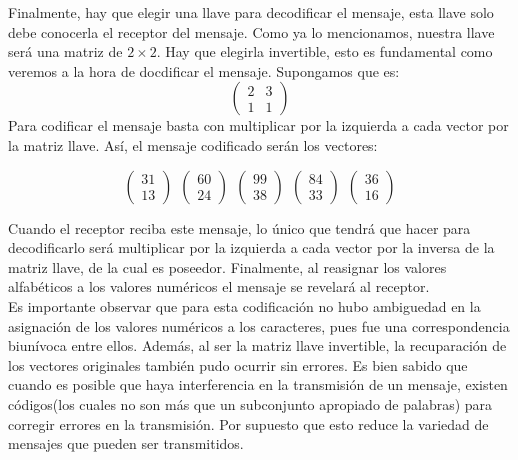 \documentclass[12pt,a4paper]{article}
\begin{document}
Finalmente, hay que elegir una llave para decodificar el mensaje, esta llave solo debe conocerla el receptor del mensaje. Como ya lo mencionamos, nuestra llave ser\'a una matriz de $2\times 2$. Hay que elegirla invertible, esto es fundamental como veremos a la hora de docdificar el mensaje. Supongamos que es:
$$\left(\begin{array}{cc}2&3\\1&1\end{array}\right)$$
\newpage
Para codificar el mensaje basta con multiplicar por la izquierda a cada vector por la matriz llave. As\'i, el mensaje codificado ser\'an los vectores:

$$\left(\begin{array}{c}31\\13\end{array}\right)~~\left(\begin{array}{c}60\\24\end{array}\right)~~\left(\begin{array}{c}99\\38\end{array}\right)~~\left(\begin{array}{c}84\\33\end{array}\right)~~\left(\begin{array}{c}36\\16\end{array}\right)$$ 


Cuando el receptor reciba este mensaje, lo \'unico que tendr\'a que hacer para decodificarlo ser\'a multiplicar por la izquierda a cada vector por la inversa de la matriz llave, de la cual es poseedor. Finalmente, al reasignar los valores alfab\'eticos a los valores num\'ericos el mensaje se revelar\'a al receptor.\\

Es importante observar que para esta codificaci\'on no hubo ambiguedad en la asignaci\'on de los valores num\'ericos a los caracteres, pues fue una correspondencia biun\'ivoca entre ellos. Adem\'as, al ser la matriz llave invertible, la recuparaci\'on de los vectores originales tambi\'en pudo ocurrir sin errores. Es bien sabido que cuando es posible que haya interferencia en la transmisi\'on de un mensaje, existen c\'odigos(los cuales no son m\'as que un subconjunto apropiado de palabras) para corregir errores en la transmisi\'on. Por supuesto que esto reduce la variedad de mensajes que pueden ser transmitidos.\\
\end{document}
